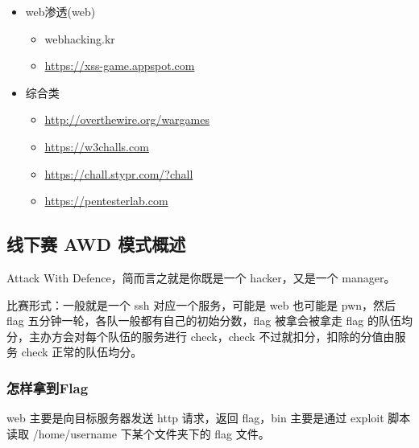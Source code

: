\begin{itemize}
\begin{itemize}
        \item web渗透(web)
        \begin{itemize}
            \item webhacking.kr
            \item \href{https://xss-game.appspot.com}{https://xss-game.appspot.com}
        \end{itemize}
        
        \item 综合类
        \begin{itemize}
            \item \href{http://overthewire.org/wargames}{http://overthewire.org/wargames}
            \item \href{https://w3challs.com}{https://w3challs.com}
            \item \href{https://chall.stypr.com/?chall}{https://chall.stypr.com/?chall}
            \item \href{https://pentesterlab.com}{https://pentesterlab.com}
        \end{itemize}
    \end{itemize}
\end{itemize}

\subsection{线下赛 AWD 模式概述}
\indent \setlength{\parindent}{2em}

\indent Attack With Defence，简而言之就是你既是一个 hacker，又是一个 manager。

\indent 比赛形式：一般就是一个 ssh 对应一个服务，可能是 web 也可能是 pwn，然后 flag 五分钟一轮，各队一般都有自己的初始分数，flag 被拿会被拿走 flag 的队伍均分，主办方会对每个队伍的服务进行 check，check 不过就扣分，扣除的分值由服务 check 正常的队伍均分。

\subsubsection{怎样拿到Flag}
\indent \setlength{\parindent}{2em}
\intent web 主要是向目标服务器发送 http 请求，返回 flag，bin 主要是通过 exploit 脚本读取 /home/username 下某个文件夹下的 flag 文件。

